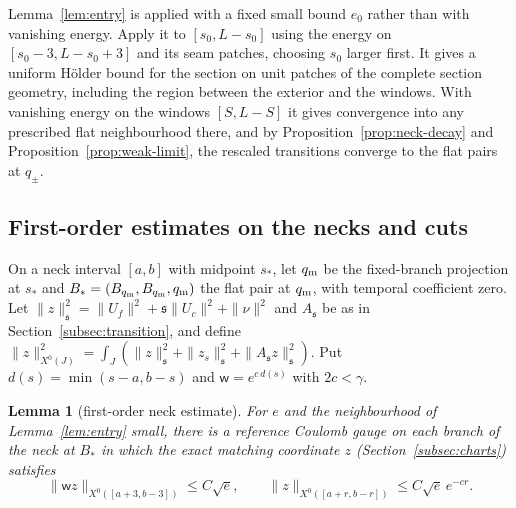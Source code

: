 \documentclass[11pt]{amsart}
\newtheorem{lemma}[theorem]{Lemma}
\theoremstyle{definition}
\theoremstyle{remark}
\theoremstyle{plain}
\numberwithin{equation}{section}
\begin{document}
Lemma~\ref{lem:entry} is applied with a fixed small bound $e_0$ rather
than with vanishing energy. Apply it to $[s_0,L-s_0]$ using the energy
on $[s_0-3,L-s_0+3]$ and its seam patches, choosing $s_0$ larger first.
It gives a uniform Hölder bound for the
section on unit patches of the complete section geometry, including the
region between the exterior and the windows. With vanishing energy on the
windows $[S,L-S]$ it gives convergence into any prescribed flat neighbourhood
there, and by Proposition~\ref{prop:neck-decay} and
Proposition~\ref{prop:weak-limit}, the rescaled transitions converge to
the flat pairs at $q_\pm$.

\subsection{First-order estimates on the necks and cuts}

On a neck interval $[a,b]$ with midpoint $s_*$, let $q_{\rm m}$ be the
fixed-branch projection at $s_*$ and $B_*=(B_{q_{\rm m}},B_{q_{\rm m}},q_{\rm m})$ the flat pair
at $q_{\rm m}$, with temporal coefficient zero. Let
$\|z\|^2_{\mathfrak s}=\|U_f\|^2+{\mathfrak s}\|U_c\|^2+\|\nu\|^2$ and $A_{\mathfrak s}$ be as in
Section~\ref{subsec:transition}, and define
$\|z\|_{X^0(J)}^2=\int_J(\|z\|^2_{\mathfrak s}+\|z_s\|_{\mathfrak s}^2+\|A_{\mathfrak s}
z\|^2_{\mathfrak s})$. Put $d(s)=\min(s-a,b-s)$ and $\mathsf w=e^{c\,d(s)}$ with
$2c<\gamma$.

\begin{lemma}[first-order neck estimate]\label{lem:neck-first-order}
For $e$ and the neighbourhood of Lemma~\ref{lem:entry} small, there is a
reference Coulomb gauge on each branch of the neck at $B_*$ in which the
exact matching coordinate $z$ (Section~\ref{subsec:charts}) satisfies
\[
\|\mathsf wz\|_{X^0([a+3,b-3])}\le C\sqrt e,\qquad
\|z\|_{X^0([a+r,b-r])}\le C\sqrt e\,e^{-cr}.
\]
\end{lemma}
\end{document}

